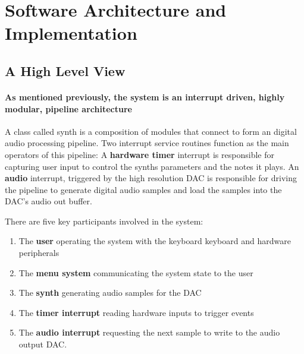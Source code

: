 \documentclass[acmlarge,screen]{acmart}
\begin{document}
\section{Software Architecture and Implementation}

\subsection{A High Level View}
	\paragraph{As mentioned previously, the system is an interrupt driven, highly modular, pipeline architecture} A class called synth is a composition of modules that connect to form an digital audio processing pipeline. Two interrupt service routines function as the main operators of this pipeline: A \textbf{hardware timer} interrupt is responsible for capturing user input to control the synths parameters and the notes it plays. An \textbf{audio} interrupt, triggered by the high resolution DAC is responsible for driving the pipeline to generate digital audio samples and load the samples into the DAC's audio out buffer.
	
	There are five key participants involved in the system:
	\begin{enumerate}
		\item The \textbf{user} operating the system with the keyboard keyboard and hardware peripherals
		\item The \textbf{menu system} communicating the system state to the user
		\item The \textbf{synth} generating audio samples for the DAC
		\item The \textbf{timer interrupt} reading hardware inputs to trigger events
		\item The \textbf{audio interrupt} requesting the next sample to write to the audio output DAC.
	\end{enumerate}

\end{document}
